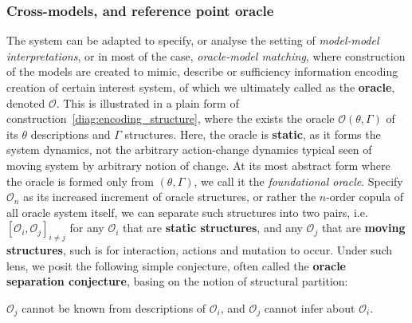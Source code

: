 \subsubsection{Cross-models, and reference point oracle}

The system can be adapted to specify, or analyse the setting of \textit{model-model interpretations}, or in most of the case, \textit{oracle-model matching}, where construction of the models are created to mimic, describe or sufficiency information encoding creation of certain interest system, of which we ultimately called as the \textbf{oracle}, denoted $\mathcal{O}$. This is illustrated in a plain form of construction~\ref{diag:encoding_structure}, where the exists the oracle $\mathcal{O}(\theta,\Gamma)$ of its $\theta$ descriptions and $\Gamma$ structures. Here, the oracle is \textbf{static}, as it forms the system dynamics, not the arbitrary action-change dynamics typical seen of moving system by arbitrary notion of change. At its most abstract form where the oracle is formed only from $(\theta,\Gamma)$, we call it the \textit{foundational oracle}. Specify $\mathcal{O}_{n}$ as its increased increment of oracle structures, or rather the $n$-order copula of all oracle system itself, we can separate such structures into two pairs, i.e. $[\mathcal{O}_{i},\mathcal{O}_{j}]_{i\neq j}$ for any $\mathcal{O}_{i}$ that are \textbf{static structures}, and any $\mathcal{O}_{j}$ that are \textbf{moving structures}, such is for interaction, actions and mutation to occur. Under such lens, we posit the following simple conjecture, often called the \textbf{oracle separation conjecture}, basing on the notion of structural partition:

\begin{conjecture}
	$\mathcal{O}_{j}$ cannot be known from descriptions of $\mathcal{O}_{i}$, and $\mathcal{O}_{j}$ cannot infer about $\mathcal{O}_{i}$.
\end{conjecture}


